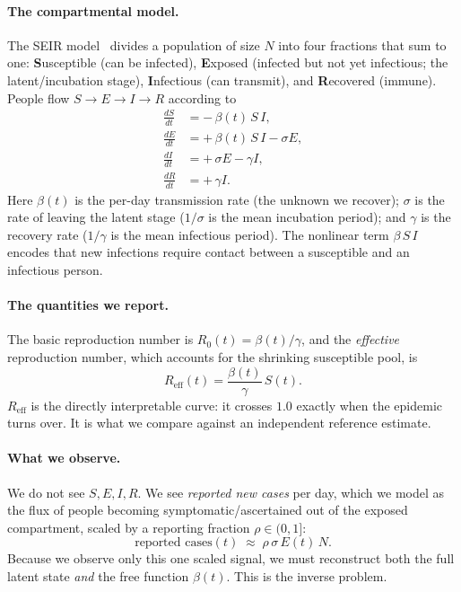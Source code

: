 \documentclass[10pt,twocolumn]{article}
\begin{document}
\paragraph{The compartmental model.}
The SEIR model~\cite{kermack1927} divides a population of size $N$ into four
fractions that sum to one: \textbf{S}usceptible (can be infected),
\textbf{E}xposed (infected but not yet infectious; the latent/incubation stage),
\textbf{I}nfectious (can transmit), and \textbf{R}ecovered (immune). People flow
$S\to E\to I\to R$ according to
%
\begin{align}
\frac{dS}{dt} &= -\,\beta(t)\,S\,I, \label{eq:S}\\
\frac{dE}{dt} &= +\,\beta(t)\,S\,I - \sigma E, \label{eq:E}\\
\frac{dI}{dt} &= +\,\sigma E - \gamma I, \label{eq:I}\\
\frac{dR}{dt} &= +\,\gamma I. \label{eq:R}
\end{align}
%
Here $\beta(t)$ is the per-day transmission rate (the unknown we recover);
$\sigma$ is the rate of leaving the latent stage ($1/\sigma$ is the mean
incubation period); and $\gamma$ is the recovery rate ($1/\gamma$ is the mean
infectious period). The nonlinear term $\beta\, S\, I$ encodes that new infections
require contact between a susceptible and an infectious person.

\paragraph{The quantities we report.}
The basic reproduction number is $R_0(t)=\beta(t)/\gamma$, and the
\emph{effective} reproduction number, which accounts for the shrinking
susceptible pool, is
%
\begin{equation}
R_{\mathrm{eff}}(t) = \frac{\beta(t)}{\gamma}\,S(t).
\label{eq:reff}
\end{equation}
%
$R_{\mathrm{eff}}$ is the directly interpretable curve: it crosses $1.0$ exactly
when the epidemic turns over. It is what we compare against an independent
reference estimate.

\paragraph{What we observe.}
We do not see $S,E,I,R$. We see \emph{reported new cases} per day, which we model
as the flux of people becoming symptomatic/ascertained out of the exposed
compartment, scaled by a reporting fraction $\rho\in(0,1]$:
%
\begin{equation}
\text{reported cases}(t) \;\approx\; \rho\,\sigma\, E(t)\, N.
\label{eq:obs}
\end{equation}
%
Because we observe only this one scaled signal, we must reconstruct both the full
latent state \emph{and} the free function $\beta(t)$. This is the inverse problem.
\end{document}
